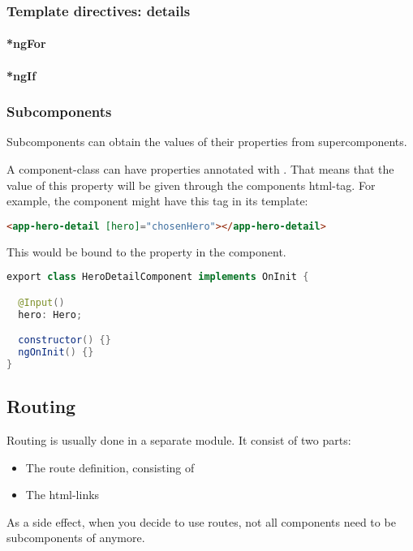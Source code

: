 \subsubsection{Template directives: details}

\paragraph{*ngFor}

\paragraph{*ngIf} 

\subsubsection{Subcomponents}

Subcomponents can obtain the values of their properties from supercomponents. 

A component-class can have properties annotated with . That means that the value of this property will be given through the components html-tag. 
For example, the component  might have this tag in its template:

\begin{lstlisting}[language=html]
    <app-hero-detail [hero]="chosenHero"></app-hero-detail>
\end{lstlisting}

This  would be bound to the  property in the  component.

\begin{lstlisting}[language=java]
export class HeroDetailComponent implements OnInit {

  @Input()
  hero: Hero;

  constructor() {}
  ngOnInit() {}
}
\end{lstlisting}


\subsection{Routing}
Routing is usually done in a separate module. It consist of two parts: 
\begin{itemize}
    \item The route definition, consisting of 
    \item The html-links
\end{itemize}
As a side effect, when you decide to use routes, not all components need to be subcomponents of  anymore.


